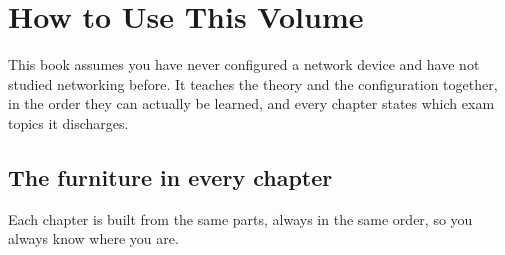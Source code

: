 \chapter*{How to Use This Volume}

This book assumes you have never configured a network device and have not
studied networking before. It teaches the theory and the configuration together,
in the order they can actually be learned, and every chapter states which exam
topics it discharges.

\section*{The furniture in every chapter}

Each chapter is built from the same parts, always in the same order, so you
always know where you are.

